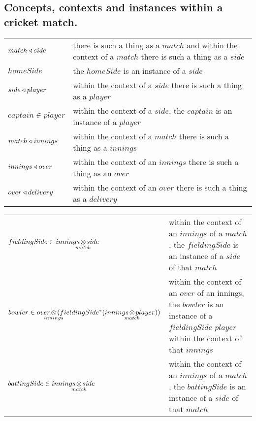\documentclass[10pt,a4paper]{article}
\begin{document}
\subsection{Concepts, contexts and instances within a cricket match.}
\newcommand{\inningsCrossSide}{\crossx{innings\kern-0.3cm}{\kern-0.3cm side}{match}}
\newcommand{\inningsCrossPlayer}{\crossx{innings\kern-0.3cm}{\kern-0.3cm player}{match}}
\newcommand{\fieldingSidePlayer}{fieldingSide ^* (\inningsCrossPlayer)}
\newcommand{\battingSidePlayer}{battingSide ^* (\inningsCrossPlayer)}
\newcommand{\overCrossFieldingSidePlayer}{\crossx{over\kern-0.4cm}{\kern-0.4cm(\fieldingSidePlayer)}{innings}}
\newcommand{\deliveryCrossBattingSidePlayer}{\crossx{delivery\kern-0.4cm}{\kern-0.4cm (\battingSidePlayer)}{innings}}
\begin{tabular}{l p{12cm}}
$match\triangleleft side$        & there is such a thing as a $match$ and within the context of a $match$ there is such a thing as a $side$  \\ 
$homeSide$               & the $homeSide$ is an instance of a $side$                             \\
$side \triangleleft player$      & within the context of a $side$ there is such a thing as a $player$   \\
$captain \in player$     & within the context of a $side$,  the $captain$ is an instance of a $player$ \\
$match \triangleleft innings$    & within the context of a $match$ there is such a thing as a $innings$    \\
$innings \triangleleft over$     & within the context of an $innings$ there is such a thing as an $over$            \\
$over \triangleleft delivery$    & within the context of an $over$ there is such a thing as a $delivery$ \\
\end{tabular}

\noindent
\begin{tabular}{l p{6.5cm}}

$fieldingSide \in \inningsCrossSide$ & within the context of an $innings$ of a $match$, 
                                      the $fieldingSide$ is an instance of a $side$ of that $match$           \\
$bowler \in \overCrossFieldingSidePlayer$ & within the context of an $over$ of an innings, the $bowler$ is an instance of a $fieldingSide$
$player$ within the context of that $innings$ \\
$battingSide \in \inningsCrossSide$ & within the context of an $innings$ of a $match$, 
                                      the $battingSide$ is an instance of a $side$ of that $match$         
\end{tabular}
\end{document}

